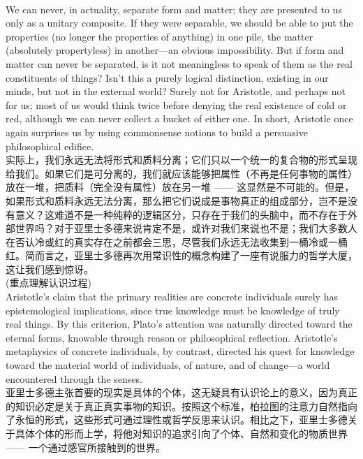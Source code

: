 \documentclass{article}
\begin{document}
\\
We can never, in actuality, separate form and matter; they are presented to us only as a unitary composite. If they were separable, we should be able to put the properties (no longer the properties of anything) in one pile, the matter (absolutely propertyless) in another—an obvious impossibility. But if form and matter can never be separated, is it not meaningless to speak of them as the real constituents of things? Isn’t this a purely logical distinction, existing in our minds, but not in the external world? Surely not for Aristotle, and perhaps not for us; most of us would think twice before denying the real existence of cold or red, although we can never collect a bucket of either one. In short, Aristotle once again surprises us by using commonsense notions to build a persuasive philosophical edifice.\\
实际上，我们永远无法将形式和质料分离；它们只以一个统一的复合物的形式呈现给我们。如果它们是可分离的，我们就应该能够把属性（不再是任何事物的属性）放在一堆，把质料（完全没有属性）放在另一堆 —— 这显然是不可能的。但是，如果形式和质料永远无法分离，那么把它们说成是事物真正的组成部分，岂不是没有意义？这难道不是一种纯粹的逻辑区分，只存在于我们的头脑中，而不存在于外部世界吗？对于亚里士多德来说肯定不是，或许对我们来说也不是；我们大多数人在否认冷或红的真实存在之前都会三思，尽管我们永远无法收集到一桶冷或一桶红。简而言之，亚里士多德再次用常识性的概念构建了一座有说服力的哲学大厦，这让我们感到惊讶。\\

(重点理解认识过程)\\
Aristotle’s claim that the primary realities are concrete individuals surely has epistemological implications, since true knowledge must be knowledge of truly real things. By this criterion, Plato’s attention was naturally directed toward the eternal forms, knowable through reason or philosophical reflection. Aristotle’s metaphysics of concrete individuals, by contrast, directed his quest for knowledge toward the material world of individuals, of nature, and of change—a world encountered through the senses.\\
亚里士多德主张首要的现实是具体的个体，这无疑具有认识论上的意义，因为真正的知识必定是关于真正真实事物的知识。按照这个标准，柏拉图的注意力自然指向了永恒的形式，这些形式可通过理性或哲学反思来认识。相比之下，亚里士多德关于具体个体的形而上学，将他对知识的追求引向了个体、自然和变化的物质世界 —— 一个通过感官所接触到的世界。\\
\end{document}
